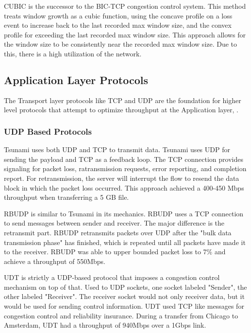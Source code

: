 CUBIC \cite{ha2008cubic} is the successor to the BIC-TCP congestion control system. This method treats window growth as a cubic function, using the concave profile on a loss event to increase back to the last recorded max window size, and the convex profile for exceeding the last recorded max window size. This approach allows for the window size to be consistently near the recorded max window size. Due to this, there is a high utilization of the network.

\subsection{Application Layer Protocols}

The Transport layer protocols like TCP and UDP are the foundation for higher level protocols that attempt to optimize throughput at the Application layer, \cite{Fan2010}\cite{Allman1997}\cite{Allman1995}\cite{Aspera2016}\cite{Meiss2007}\cite{gu2007udt}\cite{lai2009designing}\cite{He2002}\cite{Sivakumar2000psockets}.

\subsubsection{UDP Based Protocols}

Tsunami \cite{Meiss2007} uses both UDP and TCP to transmit data. Tsunami uses UDP for sending the payload and TCP as a feedback loop. The TCP connection provides signaling for packet loss, ratransmission requests, error reporting, and completion report. For retransmission, the server will interrupt the flow to resend the data block in which the packet loss occurred. This approach achieved a 400-450 Mbps throughput when transferring a 5 GB file.

RBUDP \cite{He2002} is similar to Tsunami in its mechanics. RBUDP uses a TCP connection to send messages between sender and receiver. The major difference is the retransmit part. RBUDP retransmits packets over UDP after the "bulk data transmission phase" has finished, which is repeated until all packets have made it to the receiver. RBUDP was able to upper bounded packet loss to 7\% and achieve a throughput of 550Mbps.

UDT \cite{gu2007udt} is strictly a UDP-based protocol that imposes a congestion control mechanism on top of that. Used to UDP sockets, one socket labeled "Sender", the other labeled "Receiver". The receiver socket would not only receiver data, but it would be used for sending control information. UDT used TCP like messages for congestion control and reliability insurance. During a transfer from Chicago to Amsterdam, UDT had a throughput of 940Mbps over a 1Gbps link.

